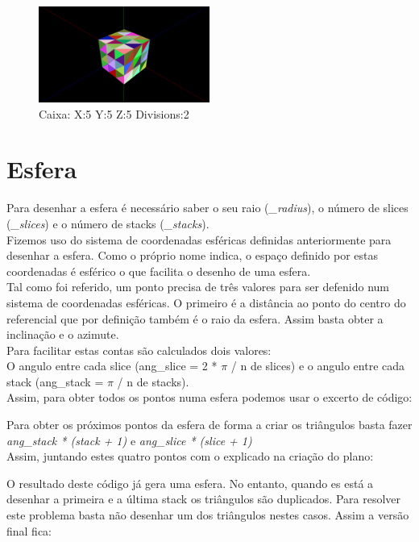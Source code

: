 \documentclass[a4paper]{report}
\begin{document}
\begin{figure}[H]
    \centering 
    \includegraphics[width=0.5\textwidth]{images/box.png}  
    \caption{Caixa: X:5 Y:5 Z:5 Divisions:2}
    \label{fig:box_render}
\end{figure}

\section{Esfera}
Para desenhar a esfera é necessário saber o seu raio (\textit{\_radius}), o
número de slices (\textit{\_slices}) e o número de stacks (\textit{\_stacks}).\\
Fizemos uso do sistema de coordenadas esféricas definidas
anteriormente para desenhar a esfera. Como o próprio nome indica, o espaço
definido por estas coordenadas é esférico o que facilita o desenho de uma
esfera.\\
Tal como foi referido, um ponto precisa de três valores para ser defenido num
sistema de coordenadas esféricas. O primeiro é a distância ao ponto do centro do
referencial que por definição também é o raio da esfera. Assim basta obter a
inclinação e o azimute.\\
Para facilitar estas contas são calculados dois valores:\\
O angulo entre cada slice (ang\_slice = 2 * $\pi$ / n de slices) e o angulo
entre cada stack (ang\_stack = $\pi$ / n de stacks).\\
Assim, para obter todos os pontos numa esfera podemos usar o excerto de código:


Para obter os próximos pontos da esfera de forma a criar os triângulos basta
fazer \textit{ang\_stack * (stack + 1)} e \textit{ang\_slice * (slice + 1)}\\
Assim, juntando estes quatro pontos com o explicado na criação do plano:


O resultado deste código já gera uma esfera. No entanto, quando es está a
desenhar a primeira e a última stack os triângulos são duplicados.
Para resolver este problema basta não desenhar um dos triângulos nestes casos.
Assim a versão final fica:
\end{document}
